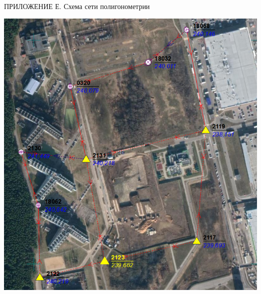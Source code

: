 \documentclass[a4paper]{article}
\begin{document}
\begin{newpage}



%
\begin{newpage}
\begin{flushright}
  \large{ПРИЛОЖЕНИЕ Е. Схема сети полигонометрии}
\end{flushright}
\begin{center}
    \includegraphics[scale=1]{1.png}
\end{center}
\end{newpage}
\end{newpage}
\begin{newpage}

\end{newpage}



\end{document}

